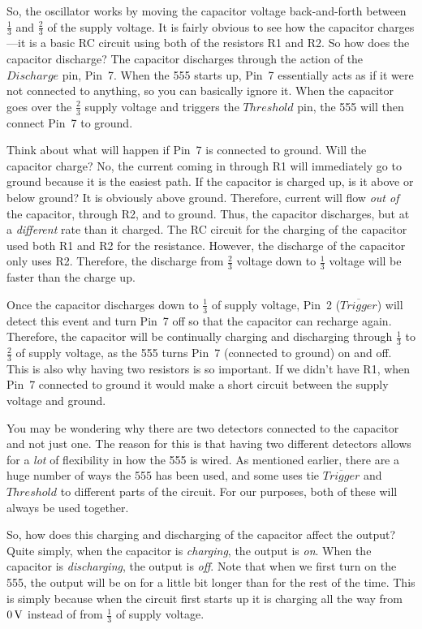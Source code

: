 So, the oscillator works by moving the capacitor voltage back-and-forth between $\frac{1}{3}$ and $\frac{2}{3}$ of the supply voltage.
It is fairly obvious to see how the capacitor charges---it is a basic RC circuit using both of the resistors R1 and R2.
So how does the capacitor discharge?
The capacitor discharges through the action of the $Discharge$ pin, Pin~7.
When the 555 starts up, Pin~7 essentially acts as if it were not connected to anything, so you can basically ignore it.
When the capacitor goes over the $\frac{2}{3}$ supply voltage and triggers the $Threshold$ pin, the 555 will then connect Pin~7 to ground.

Think about what will happen if Pin~7 is connected to ground.
Will the capacitor charge?
No, the current coming in through R1 will immediately go to ground because it is the easiest path.
If the capacitor is charged up, is it above or below ground?
It is obviously above ground.
Therefore, current will flow \emph{out of} the capacitor, through R2, and to ground.
Thus, the capacitor discharges, but at a \emph{different} rate than it charged.
The RC circuit for the charging of the capacitor used both R1 and R2 for the resistance.
However, the discharge of the capacitor only uses R2.
Therefore, the discharge from $\frac{2}{3}$ voltage down to $\frac{1}{3}$ voltage will be faster than the charge up.

Once the capacitor discharges down to $\frac{1}{3}$ of supply voltage, Pin~2 ($\overline{Trigger}$) will detect this event and turn Pin~7 off so that the capacitor can recharge again.
Therefore, the capacitor will be continually charging and discharging through $\frac{1}{3}$ to $\frac{2}{3}$ of supply voltage, as the 555 turns Pin~7 (connected to ground) on and off.
This is also why having two resistors is so important.
If we didn't have R1, when Pin~7 connected to ground it would make a short circuit between the supply voltage and ground.

You may be wondering why there are two detectors connected to the capacitor and not just one.
The reason for this is that having two different detectors allows for a \emph{lot} of flexibility in how the 555 is wired.
As mentioned earlier, there are a huge number of ways the 555 has been used, and some uses tie $\overline{Trigger}$ and $Threshold$ to different parts of the circuit.
For our purposes, both of these will always be used together.

So, how does this charging and discharging of the capacitor affect the output?
Quite simply, when the capacitor is \emph{charging}, the output is \emph{on}.
When the capacitor is \emph{discharging}, the output is \emph{off}.
Note that when we first turn on the 555, the output will be on for a little bit longer than for the rest of the time.
This is simply because when the circuit first starts up it is charging all the way from $0\,\si{\volt}$ instead of from $\frac{1}{3}$ of supply voltage.

